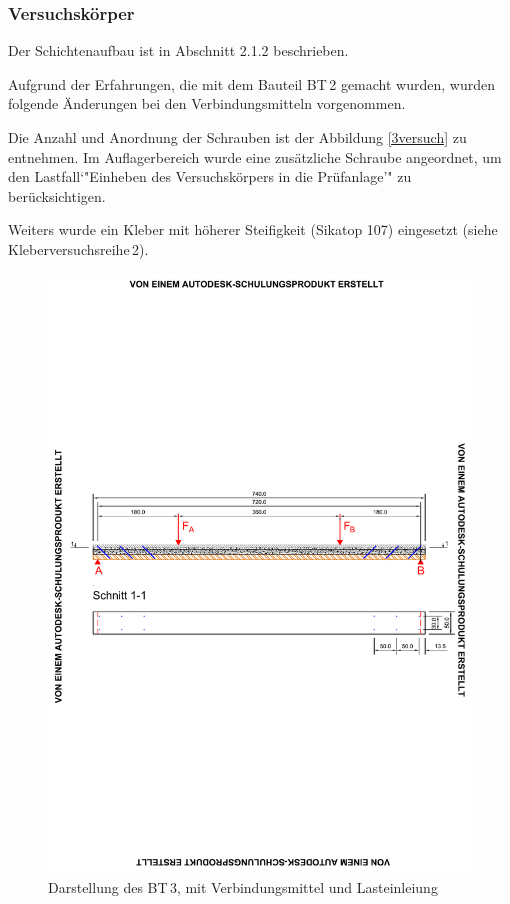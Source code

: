 \subsubsection{Versuchskörper}
\label{abs:BT3_Versuchskoerper}

Der Schichtenaufbau ist in Abschnitt 2.1.2 beschrieben. 

Aufgrund der Erfahrungen, die mit dem Bauteil BT\,2 gemacht wurden, wurden folgende Änderungen bei den Verbindungsmitteln vorgenommen.

Die Anzahl und Anordnung der Schrauben ist der Abbildung \ref{3versuch} zu entnehmen. Im Auflagerbereich wurde eine zusätzliche Schraube angeordnet, um den Lastfall`"Einheben des Versuchskörpers in die Prüfanlage'" zu berücksichtigen.  

Weiters wurde ein Kleber mit höherer Steifigkeit (Sikatop 107) eingesetzt (siehe Kleberversuchsreihe\,2).


\begin{figure}[h!]
\begin{center}
\includegraphics[scale =0.9,trim= 1.5cm 10cm 1.5cm 10cm, clip=true]{Auswertung/3versuch/BT3.pdf}
\caption{Darstellung des BT\,3, mit Verbindungsmittel und Lasteinleiung}
\label{1versuch}
\end{center}
\end{figure}

